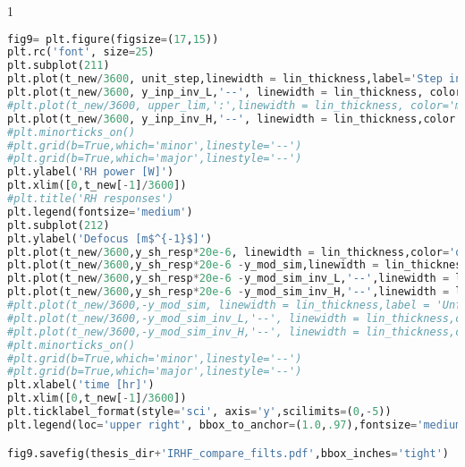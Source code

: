 \begin{spacing}{1} \begin{lstlisting}[language=Python]
fig9= plt.figure(figsize=(17,15))
plt.rc('font', size=25)
plt.subplot(211)
plt.plot(t_new/3600, unit_step,linewidth = lin_thickness,label='Step input', color= 'purple')
plt.plot(t_new/3600, y_inp_inv_L,'--', linewidth = lin_thickness, color = 'green',label='Filtered input (H$^{-1}$(s)G$_{1}$(s))')
#plt.plot(t_new/3600, upper_lim,':',linewidth = lin_thickness, color='magenta', label='RH upper limit')
plt.plot(t_new/3600, y_inp_inv_H,'--', linewidth = lin_thickness,color = 'red', label='Filtered input (H$^{-1}$(s)G$_{2}$(s))')
#plt.minorticks_on()
#plt.grid(b=True,which='minor',linestyle='--')
#plt.grid(b=True,which='major',linestyle='--')
plt.ylabel('RH power [W]')
plt.xlim([0,t_new[-1]/3600])
#plt.title('RH responses')
plt.legend(fontsize='medium')
plt.subplot(212)
plt.ylabel('Defocus [m$^{-1}$]')
plt.plot(t_new/3600,y_sh_resp*20e-6, linewidth = lin_thickness,color='orange',label ='self heating w/ no RH')
plt.plot(t_new/3600,y_sh_resp*20e-6 -y_mod_sim,linewidth = lin_thickness,label='self heating + step input',color='purple')
plt.plot(t_new/3600,y_sh_resp*20e-6 -y_mod_sim_inv_L,'--',linewidth = lin_thickness,label='self heating + filtered input (H$^{-1}$(s)G$_{1}$(s))',color='green')
plt.plot(t_new/3600,y_sh_resp*20e-6 -y_mod_sim_inv_H,'--',linewidth = lin_thickness,label='self heating + filtered input (H$^{-1}$(s)G$_{2}$(s))',color='red')
#plt.plot(t_new/3600,-y_mod_sim, linewidth = lin_thickness,label = 'Unfiltered step input',color='purple')
#plt.plot(t_new/3600,-y_mod_sim_inv_L,'--', linewidth = lin_thickness,color='green',label ='Filtered input (H$^{-1}$(s)G$_{2}$(s))')
#plt.plot(t_new/3600,-y_mod_sim_inv_H,'--', linewidth = lin_thickness,color='red',label ='Filtered input (H$^{-1}$(s)G$_{1}$(s))')
#plt.minorticks_on()
#plt.grid(b=True,which='minor',linestyle='--')
#plt.grid(b=True,which='major',linestyle='--')
plt.xlabel('time [hr]')
plt.xlim([0,t_new[-1]/3600])
plt.ticklabel_format(style='sci', axis='y',scilimits=(0,-5))
plt.legend(loc='upper right', bbox_to_anchor=(1.0,.97),fontsize='medium')

fig9.savefig(thesis_dir+'IRHF_compare_filts.pdf',bbox_inches='tight')
\end{lstlisting} \end{spacing}


